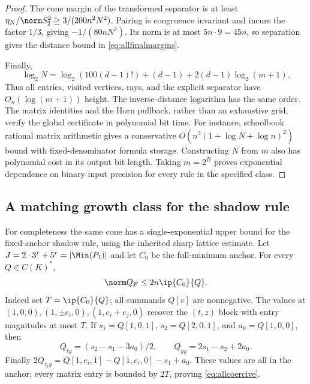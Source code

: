 \begin{proof}
The cone margin of the transformed separator is at least $\eta_N/\norm S_2^2\ge3/(200n^2N^2)$. Pairing is congruence invariant and incurs the factor $1/3$, giving $-1/(80nN^2)$. Its norm is at most $5n\cdot9=45n$, so separation gives the distance bound in \eqref{eq:allfinalmargins}.

Finally,
\[
 \log_2N=\log_2(100(d-1)!)+(d-1)+2(d-1)\log_2(m+1).
\]
Thus all entries, visited vertices, rays, and the explicit separator have $O_n(\log(m+1))$ height. The inverse-distance logarithm has the same order. The matrix identities and the Horn pullback, rather than an exhaustive grid, verify the global certificate in polynomial bit time. For instance, schoolbook rational matrix arithmetic gives a conservative $O(n^3(1+\log N+\log n)^2)$ bound with fixed-denominator formula storage. Constructing $N$ from $m$ also has polynomial cost in its output bit length. Taking $m=2^B$ proves exponential dependence on binary input precision for every rule in the specified class.
\end{proof}

\subsection{A matching growth class for the shadow rule}
For completeness the same cone has a single-exponential upper bound for the fixed-anchor shadow rule, using the inherited sharp lattice estimate. Let $J=2\cdot3^r+5^r=|\Min(P_1)|$ and let $C_0$ be the full-minimum anchor. For every $Q\in C(K)^*$,
\begin{equation}\label{eq:allcoercive}
 \norm Q_F\le2n\ip{C_0}{Q}.
\end{equation}
Indeed set $T=\ip{C_0}{Q}$; all summands $Q[v]$ are nonnegative. The values at $(1,0,0),(1,\pm e_i,0),(1,e_i+e_j,0)$ recover the $(t,z)$ block with entry magnitudes at most $T$. If $s_1=Q[1,0,1]$, $s_2=Q[2,0,1]$, and $a_0=Q[1,0,0]$, then
\[
 Q_{ty}=(s_2-s_1-3a_0)/2,\qquad Q_{yy}=2s_1-s_2+2a_0.
\]
Finally $2Q_{z_iy}=Q[1,e_i,1]-Q[1,e_i,0]-s_1+a_0$. These values are all in the anchor; every matrix entry is bounded by $2T$, proving \eqref{eq:allcoercive}.

